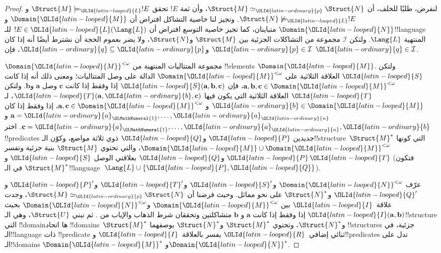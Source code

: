 \documentclass[../../../include/open-logic-section]{subfiles}
\begin{document}
\begin{proof}
لنفرض، طلبًا للخلف، أن $\Struct{M} \simeq_\OLId{latin-ordinary}{p} \Struct{N}$، وأن ثمة $!E$ تحقق
$\Struct{M} \models_\OLId{latin-looped}{L} !E$ و$\Struct{N} \not\models_\OLId{latin-looped}{L} !E$. وتجيز لنا خاصية
التشاكل افتراض أن $\Domain{\OLId{latin-looped}{M}}$ و$\Domain{\OLId{latin-looped}{N}}$ متباينان، كما تجيز خاصية
التوسع افتراض أن $!E \in \OLId{latin-looped}{L}(\Lang{L})$ للـ!!{language} المنتهية
$\Lang{L}$. ولتكن $\mathcal{I}$ مجموعة من التشاكلات الجزئية بين
$\Struct{M}$ و$\Struct{N}$، ولا يضر بعموم الحجة أن نشترط أيضًا أنه إذا
كان $\OLId{latin-ordinary}{p} \in \mathcal{I}$ و$\OLId{latin-ordinary}{q} \subseteq \OLId{latin-ordinary}{p}$، فإن $\OLId{latin-ordinary}{q} \in \mathcal{I}$.

$\Domain{\OLId{latin-looped}{M}}^{<\omega}$ مجموعة المتتاليات المنتهية من !!{element}s
$\Domain{\OLId{latin-looped}{M}}$. ولتكن $\OLId{latin-looped}{S}$ العلاقة الثلاثية على $\Domain{\OLId{latin-looped}{M}}^{<\omega}$
الدالة على وصل المتتاليات؛ ومعنى ذلك أنه إذا كانت
$\mathbf{a},\mathbf{b},\mathbf{c} \in \Domain{\OLId{latin-looped}{M}}^{<\omega}$، فإن
$\OLId{latin-looped}{S}(\mathbf{a},\mathbf{b},\mathbf{c})$ إذا وفقط إذا كانت $\mathbf{c}$
وصل $\mathbf{a}$ و$\mathbf{b}$. ولتكن $\OLId{latin-looped}{T}$ العلاقة الثلاثية التي يكون
فيها $\OLId{latin-looped}{T}(\mathbf{a},\OLId{latin-ordinary}{b},\mathbf{c})$، لـ$\OLId{latin-ordinary}{b} \in \Domain{\OLId{latin-looped}{M}}$ و
$\mathbf{a},\mathbf{c} \in \Domain{\OLId{latin-looped}{M}}^{<\omega}$، إذا وفقط إذا كان
$\mathbf{a}=\OLId{latin-ordinary}{a}_\OLMathNumeral{1},\dots,\OLId{latin-ordinary}{a}_\OLId{latin-ordinary}{n}$ و$\mathbf{c}=\OLId{latin-ordinary}{a}_\OLMathNumeral{1},\dots,\OLId{latin-ordinary}{a}_\OLId{latin-ordinary}{n},\OLId{latin-ordinary}{b}$. اختر
!!{predicate}s جديدين $\OLId{latin-looped}{P}$ و$\OLId{latin-looped}{Q}$ ذوي ثلاثة مواضع، وكوّن
الـ!!{structure}~$\Struct{M}^*$ التي كونها
$\Domain{\OLId{latin-looped}{M}} \cup \Domain{\OLId{latin-looped}{M}}^{<\omega}$، والتي تحتوي $\Struct{M}$
بنية جزئية وتفسر $\OLId{latin-looped}{P}$ و$\OLId{latin-looped}{Q}$ بعلاقتي الوصل $\OLId{latin-looped}{S}$ و$\OLId{latin-looped}{T}$ (فتكون
$\Struct{M}^*$ في الـ!!{language}~$\Lang{L} \cup \{\OLId{latin-looped}{P},\OLId{latin-looped}{Q}\}$).

عرّف $\Domain{\OLId{latin-looped}{N}}^{<\omega}$ و$\OLId{latin-looped}{S}'$ و$\OLId{latin-looped}{T}'$ و$\OLId{latin-looped}{P}'$ و$\OLId{latin-looped}{Q}'$ و$\Struct{N}^*$
على نحو مماثل. وحيث فرضنا أن $\Struct{M} \simeq_\OLId{latin-ordinary}{p} \Struct{N}$، وجدت
علاقة~$\OLId{latin-looped}{I}$ بين $\Domain{\OLId{latin-looped}{M}}^{<\omega}$ و$\Domain{\OLId{latin-looped}{N}}^{<\omega}$ بحيث
$\OLId{latin-looped}{I}(\mathbf{a},\mathbf{b})$ إذا وفقط إذا كانت $\mathbf{a}$ و
$\mathbf{b}$ متشاكلتين وتحققان شرط الذهاب والإياب من
. ثم نبني $\Struct{U}$، وهي
الـ!!{structure} التي !!{domain}ها اتحاد !!{domain}s~$\Struct{M}^*$
و$\Struct{N}^*$، وتحتوي $\Struct{M}^*$ و$\Struct{N}^*$ بوصفهما
!!{structure}s جزئية، في الـ!!{language} ذات !!{predicate} ثنائي
إضافي~$\OLId{latin-looped}{R}$ يفسر بالعلاقة~$\OLId{latin-looped}{I}$ و!!{predicate}s تدل على الـ!!{domain}s
$\Domain{\OLId{latin-looped}{M}}^*$ و$\Domain{\OLId{latin-looped}{N}}^*$.


\end{proof}
\end{document}
